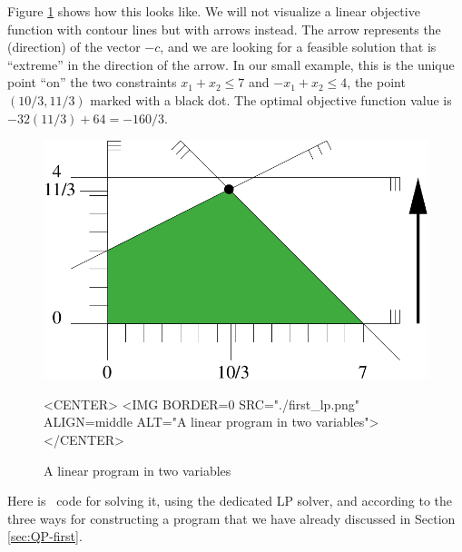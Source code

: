 Figure \ref{fig:QP-first_lp} shows how this looks like. We will not
visualize a linear objective function with contour lines but with
arrows instead. The arrow represents the (direction) of the vector $-c$,
and we are looking for a feasible solution that is ``extreme'' in the direction
of the arrow. In our small example, this is the unique point ``on'' the
two constraints $x_1+x_2\leq 7$ and $-x_1+x_2\leq 4$, the point
$(10/3,11/3)$ marked with a black dot. The optimal objective function
value is $-32(11/3)+64=-160/3$.

\begin{figure}[htbp]
\begin{ccTexOnly}
\begin{center}
\includegraphics{QP_solver/first_lp} %
\end{center}
\end{ccTexOnly}

\begin{ccHtmlOnly}
<CENTER>
<IMG BORDER=0 SRC="./first_lp.png" ALIGN=middle ALT="A linear program in two variables">
</CENTER>
\end{ccHtmlOnly}

\caption{A linear program in two variables
\label{fig:QP-first_lp}}
\end{figure}

Here is \cgal\ code for solving it, using the dedicated LP solver, and
according to the three ways for constructing a program that we have
already discussed in Section \ref{sec:QP-first}. 

\\
\\

